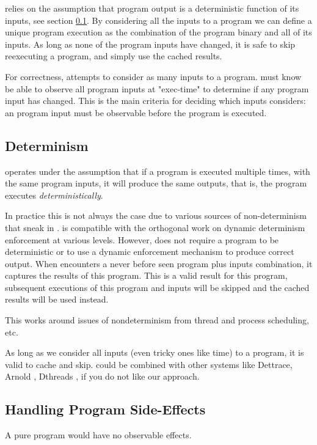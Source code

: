 \pc relies on the assumption that program output is a deterministic function of its inputs, see section \ref{determinism}. By considering all the inputs to a program we can define a unique program execution
as the combination of the program binary and all of its inputs. As long as none of the program inputs have changed, it is safe to skip reexecuting a program, and simply use the cached results.

For correctness, \pc attempts to consider as many inputs to a program. \pc must know be able to observe
all program inputs at "exec-time" to determine if any program input has changed. This is the main criteria for deciding which inputs \pc considers: an program input must be observable before the program is executed. 


\subsection{Determinism} \label{determinism}
\pc operates under the assumption that if a program is executed multiple times, with the same program
inputs, it will produce the same outputs, that is, the program executes \textit{deterministically}.

In practice this is not always the case due to various sources of non-determinism that sneak in \cite{dettrace}. \pc is compatible with the orthogonal work on dynamic determinism enforcement at various levels. However,
\pc does not require a program to be deterministic or to use a dynamic enforcement mechanism to produce correct output. When \pc encounters a never before seen program plus inputs combination, it captures the results of this program. This is a valid result for this program, subsequent executions of this program and inputs will be skipped and the cached results will be used instead.

This works around issues of nondeterminism from thread and process scheduling, etc.

As long as we consider all inputs (even tricky ones like time) to a program, it is valid to cache and skip. \pc could be combined with other systems like Dettrace, Arnold \cite{arnold}, Dthreads \cite{dthreads}, if you do not like our approach.

\subsection{Handling Program Side-Effects}
A pure program would have no observable effects.

